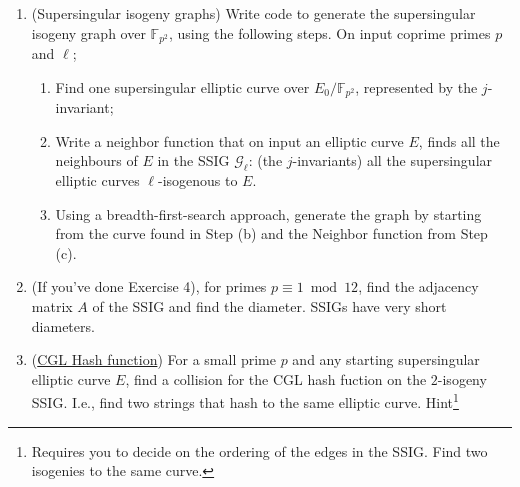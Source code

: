 \documentclass[12pt]{report}
\begin{document}
\begin{enumerate}
\item (Supersingular isogeny graphs) Write code to generate the supersingular isogeny graph over $\mathbb{F}_{p^2}$, using the following steps. On input coprime  primes $p$  and $\ell$;
\begin{enumerate}
\item Find one supersingular elliptic curve over $E_0/ \mathbb{F}_{p^2}$, represented by the $j$-invariant;
\item Write a neighbor function that on input an elliptic curve $E$, finds all the neighbours of $E$ in the SSIG $\mathcal{G}_\ell$: (the $j$-invariants) all the supersingular elliptic curves $\ell$-isogenous to $E$.
\item Using a breadth-first-search approach, generate the graph by starting from the curve found in Step (b) and the Neighbor function from Step (c).
\end{enumerate}
\item (If you've done Exercise 4), for primes $p \equiv 1 \bmod 12$, find the adjacency matrix $A$ of the SSIG and find the diameter. SSIGs have very short diameters.
\item (\href{https://eprint.iacr.org/2006/021.pdf}{CGL Hash function}) For a small prime $p$ and any starting supersingular elliptic curve $E$, find a collision for the CGL hash fuction on the $2$-isogeny SSIG. I.e., find two strings that hash to the same elliptic curve. Hint\footnote{Requires you to decide on the ordering of the edges in the SSIG. Find two isogenies to the same curve.}
\end{enumerate}
\end{document}
